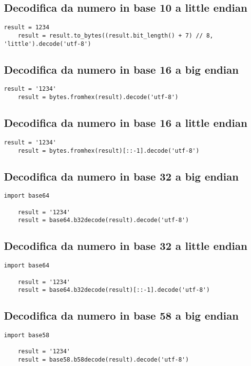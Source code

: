\subsection{Decodifica da numero in base 10 a little endian}
\begin{lstlisting}[style=pythonStyle]
    result = 1234
    result = result.to_bytes((result.bit_length() + 7) // 8, 'little').decode('utf-8')
\end{lstlisting}
\subsection{Decodifica da numero in base 16 a big endian}
\begin{lstlisting}[style=pythonStyle]
    result = '1234'
    result = bytes.fromhex(result).decode('utf-8')
\end{lstlisting}
\subsection{Decodifica da numero in base 16 a little endian}
\begin{lstlisting}[style=pythonStyle]
    result = '1234'
    result = bytes.fromhex(result)[::-1].decode('utf-8')
\end{lstlisting}
\subsection{Decodifica da numero in base 32 a big endian}
\begin{lstlisting}[style=pythonStyle]
    import base64

    result = '1234'
    result = base64.b32decode(result).decode('utf-8')
\end{lstlisting}
\subsection{Decodifica da numero in base 32 a little endian}
\begin{lstlisting}[style=pythonStyle]
    import base64

    result = '1234'
    result = base64.b32decode(result)[::-1].decode('utf-8')
\end{lstlisting}
\subsection{Decodifica da numero in base 58 a big endian}
\begin{lstlisting}[style=pythonStyle]
    import base58

    result = '1234'
    result = base58.b58decode(result).decode('utf-8')
\end{lstlisting}
